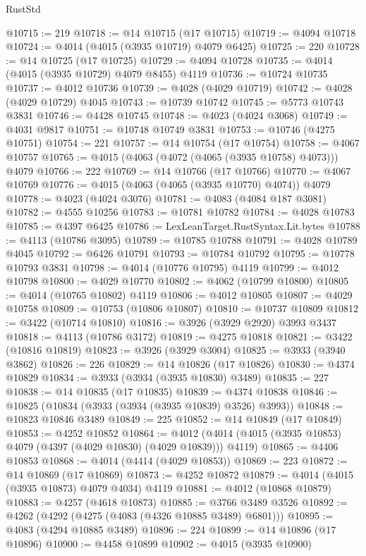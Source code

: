 \begin{lexlean}{RustStd}
\begin{coremodule}
@10715 := 219
@10718 := @14 @10715 (@17 @10715)
@10719 := @4094 @10718
@10724 := @4014 (@4015 (@3935 @10719) @4079 @6425)
@10725 := 220
@10728 := @14 @10725 (@17 @10725)
@10729 := @4094 @10728
@10735 := @4014 (@4015 (@3935 @10729) @4079 @8455) @4119
@10736 := @10724 @10735
@10737 := @4012 @10736
@10739 := @4028 (@4029 @10719)
@10742 := @4028 (@4029 @10729) @4045
@10743 := @10739 @10742
@10745 := @5773 @10743 @3831
@10746 := @4428 @10745
@10748 := @4023 (@4024 @3068)
@10749 := @4031 @9817
@10751 := @10748 @10749 @3831
@10753 := @10746 (@4275 @10751)
@10754 := 221
@10757 := @14 @10754 (@17 @10754)
@10758 := @4067 @10757
@10765 := @4015 (@4063 (@4072 (@4065 (@3935 @10758) @4073))) @4079
@10766 := 222
@10769 := @14 @10766 (@17 @10766)
@10770 := @4067 @10769
@10776 := @4015 (@4063 (@4065 (@3935 @10770) @4074)) @4079
@10778 := @4023 (@4024 @3076)
@10781 := @4083 (@4084 @187 @3081)
@10782 := @4555 @10256
@10783 := @10781 @10782
@10784 := @4028 @10783
@10785 := @4397 @6425
@10786 := LexLeanTarget.RustSyntax.Lit.bytes
@10788 := @4113 (@10786 @3095)
@10789 := @10785 @10788
@10791 := @4028 @10789 @4045
@10792 := @6426 @10791
@10793 := @10784 @10792
@10795 := @10778 @10793 @3831
@10798 := @4014 (@10776 @10795) @4119
@10799 := @4012 @10798
@10800 := @4029 @10770
@10802 := @4062 (@10799 @10800)
@10805 := @4014 (@10765 @10802) @4119
@10806 := @4012 @10805
@10807 := @4029 @10758
@10809 := @10753 (@10806 @10807)
@10810 := @10737 @10809
@10812 := @3422 (@10714 @10810)
@10816 := @3926 (@3929 @2920) @3993 @3437
@10818 := @4113 (@10786 @3172)
@10819 := @4275 @10818
@10821 := @3422 (@10816 @10819)
@10823 := @3926 (@3929 @3004)
@10825 := @3933 (@3940 @3862)
@10826 := 226
@10829 := @14 @10826 (@17 @10826)
@10830 := @4374 @10829
@10834 := @3933 (@3934 (@3935 @10830) @3489)
@10835 := 227
@10838 := @14 @10835 (@17 @10835)
@10839 := @4374 @10838
@10846 := @10825 (@10834 (@3933 (@3934 (@3935 @10839) @3526) @3993))
@10848 := @10823 @10846 @3489
@10849 := 225
@10852 := @14 @10849 (@17 @10849)
@10853 := @4252 @10852
@10864 := @4012 (@4014 (@4015 (@3935 @10853) @4079 (@4397 (@4029 @10830) (@4029 @10839))) @4119)
@10865 := @4406 @10853
@10868 := @4014 (@4414 (@4029 @10853))
@10869 := 223
@10872 := @14 @10869 (@17 @10869)
@10873 := @4252 @10872
@10879 := @4014 (@4015 (@3935 @10873) @4079 @4034) @4119
@10881 := @4012 (@10868 @10879)
@10883 := @4257 (@4618 @10873)
@10885 := @3766 @3489 @3526
@10892 := @4262 (@4292 (@4275 (@4083 (@4326 @10885 @3489) @6801)))
@10895 := @4083 (@4294 @10885 @3489)
@10896 := 224
@10899 := @14 @10896 (@17 @10896)
@10900 := @4458 @10899
@10902 := @4015 (@3935 @10900)

\end{coremodule}
\end{lexlean}
